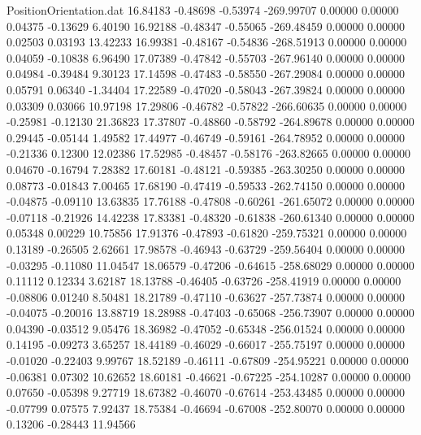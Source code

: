 \begin{filecontents}{PositionOrientation.dat}
  16.84183   -0.48698   -0.53974  -269.99707    0.00000    0.00000    0.04375   -0.13629    6.40190
  16.92188   -0.48347   -0.55065  -269.48459    0.00000    0.00000    0.02503    0.03193   13.42233
  16.99381   -0.48167   -0.54836  -268.51913    0.00000    0.00000    0.04059   -0.10838    6.96490
  17.07389   -0.47842   -0.55703  -267.96140    0.00000    0.00000    0.04984   -0.39484    9.30123
  17.14598   -0.47483   -0.58550  -267.29084    0.00000    0.00000    0.05791    0.06340   -1.34404
  17.22589   -0.47020   -0.58043  -267.39824    0.00000    0.00000    0.03309    0.03066   10.97198
  17.29806   -0.46782   -0.57822  -266.60635    0.00000    0.00000   -0.25981   -0.12130   21.36823
  17.37807   -0.48860   -0.58792  -264.89678    0.00000    0.00000    0.29445   -0.05144    1.49582
  17.44977   -0.46749   -0.59161  -264.78952    0.00000    0.00000   -0.21336    0.12300   12.02386
  17.52985   -0.48457   -0.58176  -263.82665    0.00000    0.00000    0.04670   -0.16794    7.28382
  17.60181   -0.48121   -0.59385  -263.30250    0.00000    0.00000    0.08773   -0.01843    7.00465
  17.68190   -0.47419   -0.59533  -262.74150    0.00000    0.00000   -0.04875   -0.09110   13.63835
  17.76188   -0.47808   -0.60261  -261.65072    0.00000    0.00000   -0.07118   -0.21926   14.42238
  17.83381   -0.48320   -0.61838  -260.61340    0.00000    0.00000    0.05348    0.00229   10.75856
  17.91376   -0.47893   -0.61820  -259.75321    0.00000    0.00000    0.13189   -0.26505    2.62661
  17.98578   -0.46943   -0.63729  -259.56404    0.00000    0.00000   -0.03295   -0.11080   11.04547
  18.06579   -0.47206   -0.64615  -258.68029    0.00000    0.00000    0.11112    0.12334    3.62187
  18.13788   -0.46405   -0.63726  -258.41919    0.00000    0.00000   -0.08806    0.01240    8.50481
  18.21789   -0.47110   -0.63627  -257.73874    0.00000    0.00000   -0.04075   -0.20016   13.88719
  18.28988   -0.47403   -0.65068  -256.73907    0.00000    0.00000    0.04390   -0.03512    9.05476
  18.36982   -0.47052   -0.65348  -256.01524    0.00000    0.00000    0.14195   -0.09273    3.65257
  18.44189   -0.46029   -0.66017  -255.75197    0.00000    0.00000   -0.01020   -0.22403    9.99767
  18.52189   -0.46111   -0.67809  -254.95221    0.00000    0.00000   -0.06381    0.07302   10.62652
  18.60181   -0.46621   -0.67225  -254.10287    0.00000    0.00000    0.07650   -0.05398    9.27719
  18.67382   -0.46070   -0.67614  -253.43485    0.00000    0.00000   -0.07799    0.07575    7.92437
  18.75384   -0.46694   -0.67008  -252.80070    0.00000    0.00000    0.13206   -0.28443   11.94566

\end{filecontents}
